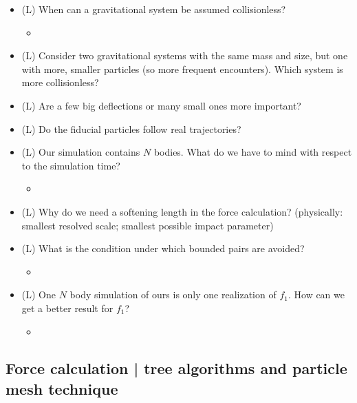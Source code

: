 \begin{itemize}
\begin{itemize}
    \end{itemize}
    \answerboxS
    \item (L) When can a gravitational system be assumed collisionless?
    \begin{itemize}
        \item {}
    \end{itemize}
    \answerboxM
    \item (L) Consider two gravitational systems with the same mass and size, but one with more, smaller particles (so more frequent encounters).
    Which system is more collisionless?
    \answerboxM
    \item (L) Are a few big deflections or many small ones more important?
    \answerboxS
    \item (L) Do the fiducial particles follow real trajectories?
    \answerboxS
    \item (L) Our simulation contains $N$ bodies. What do we have to mind with respect to the simulation time?
    \begin{itemize}
        \item {}
    \end{itemize}
    \answerboxS
    \item (L) Why do we need a softening length in the force calculation? (physically: smallest resolved scale; smallest possible impact parameter)
    \answerboxM
    \item (L) What is the condition under which bounded pairs are avoided?
    \begin{itemize}
        \item {}
    \end{itemize}
    \answerboxS
    \item (L) One $N$ body simulation of ours is only one realization of $f_1$. How can we get
    a better result for $f_1$?
    \begin{itemize}
        \item {}
    \end{itemize}
    \answerboxS
\end{itemize}

\subsection*{Force calculation | tree algorithms and particle mesh technique}

